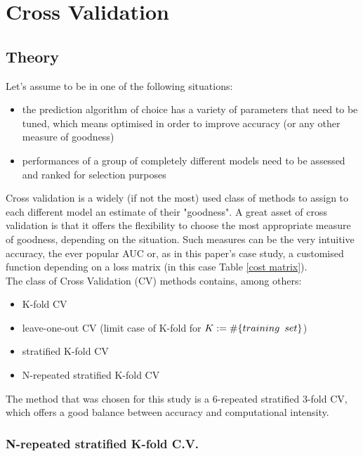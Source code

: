 \documentclass[a4paper,12pt]{article}
\begin{document}
\section{Cross Validation}\label{Sec::CV}
\subsection{Theory}
Let's assume to be in one of the following situations: 
\begin{itemize}
\item the prediction algorithm of choice has a variety of parameters that need to be tuned, which means optimised in order to improve accuracy (or any other measure of goodness)
\item performances of a group of completely different models need to be assessed and ranked for selection purposes
\end{itemize}
Cross validation is a widely (if not the most) used class of methods to assign to each different model an estimate of their "goodness". A great asset of cross validation is that it offers the flexibility to choose the most appropriate measure of goodness, depending on the situation. Such measures can be the very intuitive accuracy, the ever popular AUC or, as in this paper's case study, a customised function depending on a loss matrix (in this case Table \ref{cost matrix}).\\
The class of Cross Validation (CV) methods contains, among others:
\begin{itemize}
\item K-fold CV
\item leave-one-out CV (limit case of K-fold for $K:= \# \{ training \enskip set\}$)
\item stratified K-fold CV
\item N-repeated stratified K-fold CV
\end{itemize}
The method that was chosen for this study is a 6-repeated  stratified 3-fold CV, which offers a good balance between accuracy and computational intensity. 

\subsubsection*{N-repeated stratified K-fold C.V.}\label{Sub::stratified}
\end{document}
